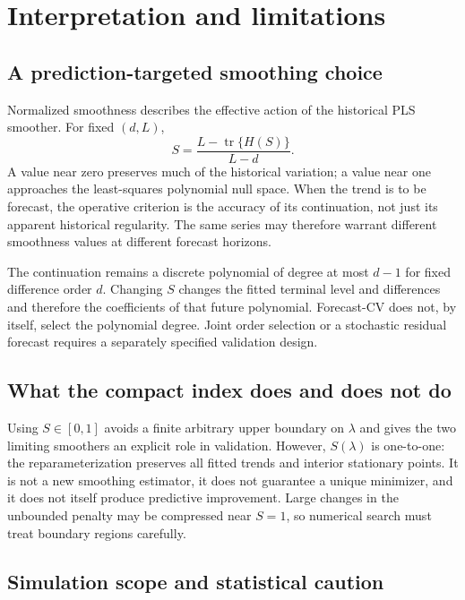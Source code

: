 \section{Interpretation and limitations}
\label{sec:discussion}

\subsection{A prediction-targeted smoothing choice}

Normalized smoothness describes the effective action
of the historical PLS smoother. For fixed $(d,L)$,
\begin{equation}
\label{eq:scope_smoothness_edf}
S=\frac{L-\operatorname{tr}\{H(S)\}}{L-d}.
\end{equation}
A value near zero preserves much of the historical
variation; a value near one approaches the
least-squares polynomial null space. When
the trend is to be forecast, the operative
criterion is the accuracy of its continuation,
not just its apparent historical regularity.
The same series may therefore warrant
different smoothness values at different
forecast horizons.

The continuation remains a discrete polynomial
of degree at most $d-1$ for fixed difference
order $d$. Changing $S$ changes the fitted
terminal level and differences and therefore
the coefficients of that future polynomial.
Forecast-CV does not, by itself, select the
polynomial degree. Joint order selection or
a stochastic residual forecast requires
a separately specified validation design.

\subsection{What the compact index does and does not do}

Using $S\in[0,1]$ avoids a finite arbitrary
upper boundary on $\lambda$ and gives the two
limiting smoothers an explicit role in
validation. However, $S(\lambda)$ is one-to-one:
the reparameterization preserves all fitted
trends and interior stationary points.
It is not a new smoothing estimator, it
does not guarantee a unique minimizer,
and it does not itself produce predictive
improvement. Large changes in the
unbounded penalty may be compressed
near $S=1$, so numerical search must
treat boundary regions carefully.

\subsection{Simulation scope and statistical caution}

